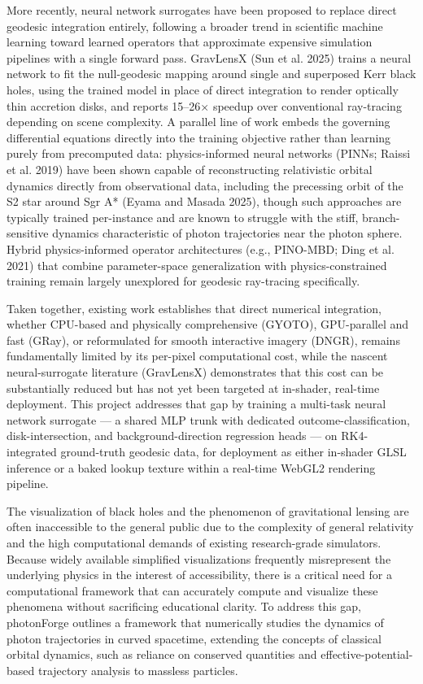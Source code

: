 \documentclass[12pt]{article}
\begin{document}
More recently, neural network surrogates have been proposed to replace direct geodesic integration entirely, following a broader trend in scientific machine learning toward learned operators that approximate expensive simulation pipelines with a single forward pass. GravLensX (Sun et al. 2025\cite{sun2025}) trains a neural network to fit the null-geodesic mapping around single and superposed Kerr black holes, using the trained model in place of direct integration to render optically thin accretion disks, and reports 15–26× speedup over conventional ray-tracing depending on scene complexity. A parallel line of work embeds the governing differential equations directly into the training objective rather than learning purely from precomputed data: physics-informed neural networks (PINNs; Raissi et al. 2019\cite{raissi2019}) have been shown capable of reconstructing relativistic orbital dynamics directly from observational data, including the precessing orbit of the S2 star around Sgr A* (Eyama and Masada 2025\cite{eyama2025}), though such approaches are typically trained per-instance and are known to struggle with the stiff, branch-sensitive dynamics characteristic of photon trajectories near the photon sphere. Hybrid physics-informed operator architectures (e.g., PINO-MBD; Ding et al. 2021) that combine parameter-space generalization with physics-constrained training remain largely unexplored for geodesic ray-tracing specifically.

Taken together, existing work establishes that direct numerical integration, whether CPU-based and physically comprehensive (GYOTO), GPU-parallel and fast (GRay), or reformulated for smooth interactive imagery (DNGR), remains fundamentally limited by its per-pixel computational cost, while the nascent neural-surrogate literature (GravLensX) demonstrates that this cost can be substantially reduced but has not yet been targeted at in-shader, real-time deployment. This project addresses that gap by training a multi-task neural network surrogate — a shared MLP trunk with dedicated outcome-classification, disk-intersection, and background-direction regression heads — on RK4-integrated ground-truth geodesic data, for deployment as either in-shader GLSL inference or a baked lookup texture within a real-time WebGL2 rendering pipeline.

The visualization of black holes and the phenomenon of gravitational lensing are often inaccessible to the general public due to the complexity of general relativity and the high computational demands of existing research-grade simulators. Because widely available simplified visualizations frequently misrepresent the underlying physics in the interest of accessibility, there is a critical need for a computational framework that can accurately compute and visualize these phenomena without sacrificing educational clarity. To address this gap, photonForge outlines a framework that numerically studies the dynamics of photon trajectories in curved spacetime, extending the concepts of classical orbital dynamics, such as reliance on conserved quantities and effective-potential-based trajectory analysis to massless particles. 
\end{document}
